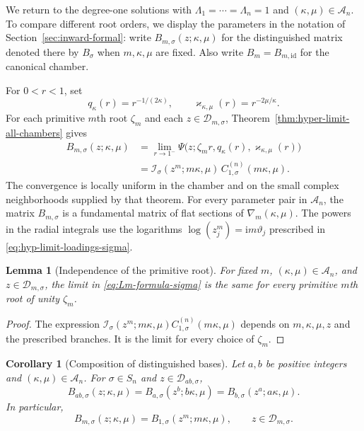\documentclass[12pt]{amsart}
\newtheorem{cor}[thm]{Corollary}
\newtheorem{lem}[thm]{Lemma}
\theoremstyle{definition}
\numberwithin{equation}{section}
\theoremstyle{definition}
\let\mc\mathcal
\let\ka\kappa
\let\La\Lambda
\let\si\sigma
\def\beq{\begin{equation}}
\def\eeq{\end{equation}}
\begin{document}
We return to the degree-one solutions with
$\La_1=\cdots=\La_n=1$ and $(\ka,\mu)\in\mc A_n$.
To compare different root orders, we display the parameters in the
notation of Section~\ref{sec:inward-formal}: write
$B_{m,\si}(z;\ka,\mu)$ for the distinguished matrix denoted there
by $B_\si$ when $m,\ka,\mu$ are fixed. Also write
$B_m=B_{m,\mathrm{id}}$ for the canonical chamber.

For $0<r<1$, set
\beq\label{eq:common-radial-parameters}
 q_\ka(r)=r^{-1/(2\ka)},\qquad
 \varkappa_{\ka,\mu}(r)=r^{-2\mu/\ka}.
\eeq
For each primitive $m$th root $\zeta_m$ and each
$z\in\mc D_{m,\si}$, Theorem~\ref{thm:hyper-limit-all-chambers}
gives
\beq\label{eq:Lm-formula-sigma}
 \begin{aligned}
 B_{m,\si}(z;\ka,\mu)
 &=\lim_{r\to1^-}
   \Psi\bigl(z;\zeta_m r,q_\ka(r),\varkappa_{\ka,\mu}(r)\bigr)\\
 &=\mc I_\si(z^m;m\ka,\mu)\,
                  C_{1,\si}^{(n)}(m\ka,\mu).
 \end{aligned}
\eeq
The convergence is locally uniform in the chamber and on the
small complex neighborhoods supplied by that theorem. For every
parameter pair in $\mc A_n$, the matrix $B_{m,\si}$ is a
fundamental matrix of flat sections of $\nabla_m(\ka,\mu)$.
The powers in the radial integrals use the logarithms
$\log(z_j^m)=\mathrm{i}m\vartheta_j$ prescribed in
\eqref{eq:hyp-limit-loadings-sigma}.

\begin{lem}[Independence of the primitive root]
\label{lem:primitive-independence}
For fixed $m$, $(\ka,\mu)\in\mc A_n$, and
$z\in\mc D_{m,\si}$, the limit in
\eqref{eq:Lm-formula-sigma} is the same for every primitive
$m$th root of unity $\zeta_m$.
\end{lem}

\begin{proof}
The expression
$\mc I_\si(z^m;m\ka,\mu)C_{1,\si}^{(n)}(m\ka,\mu)$
depends on $m,\ka,\mu,z$ and the prescribed branches. It is the
limit for every choice of $\zeta_m$.
\end{proof}

\begin{cor}[Composition of distinguished bases]
\label{cor:solution-composition}
Let $a,b$ be positive integers and $(\ka,\mu)\in\mc A_n$.
For $\si\in S_n$ and $z\in\mc D_{ab,\si}$,
\beq\label{eq:solution-composition-sigma}
 \boxed{\quad
 B_{ab,\si}(z;\ka,\mu)
 =B_{a,\si}(z^b;b\ka,\mu)
 =B_{b,\si}(z^a;a\ka,\mu).
 \quad}
\eeq
In particular,
\beq\label{eq:Lm-to-L1-sigma}
 B_{m,\si}(z;\ka,\mu)=B_{1,\si}(z^m;m\ka,\mu),
 \qquad z\in\mc D_{m,\si}.
\eeq
\end{cor}
\end{document}
